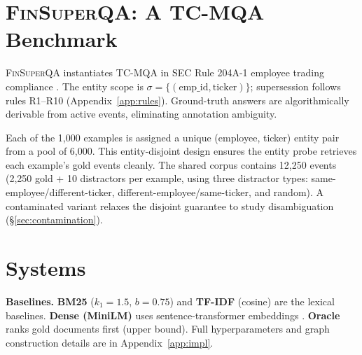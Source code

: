 \documentclass[11pt]{article}
\newcommand{\dataset}{\textsc{FinSuperQA}}
\begin{document}
\section{\dataset{}: A TC-MQA Benchmark}
\label{sec:dataset}

\dataset{} instantiates TC-MQA in SEC Rule 204A-1 employee trading compliance \cite{sec204a1}. The entity scope is $\sigma = \{(\text{emp\_id}, \text{ticker})\}$; supersession follows rules R1--R10 (Appendix~\ref{app:rules}). Ground-truth answers are algorithmically derivable from active events, eliminating annotation ambiguity.

Each of the 1,000 examples is assigned a unique (employee, ticker) entity pair from a pool of 6,000. This entity-disjoint design ensures the entity probe retrieves each example's gold events cleanly. The shared corpus contains 12,250 events (2,250 gold + 10 distractors per example, using three distractor types: same-employee/different-ticker, different-employee/same-ticker, and random). A contaminated variant relaxes the disjoint guarantee to study disambiguation (\S\ref{sec:contamination}).

\begin{table}[t]
\centering
\small
{}
\caption{\dataset{} statistics.}
\label{tab:dataset}
\end{table}

\section{Systems}
\label{sec:systems}

\textbf{Baselines.} \textbf{BM25} \cite{robertson1994bm25} ($k_1=1.5$, $b=0.75$) and \textbf{TF-IDF} (cosine) are the lexical baselines. \textbf{Dense (MiniLM)} uses sentence-transformer embeddings \cite{reimers2019sentencebert}. \textbf{Oracle} ranks gold documents first (upper bound). Full hyperparameters and graph construction details are in Appendix~\ref{app:impl}.
\end{document}
